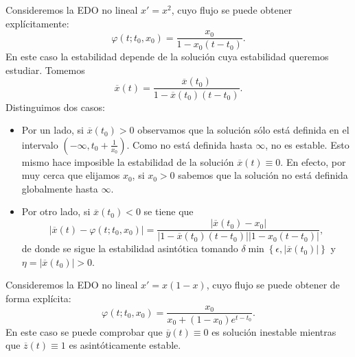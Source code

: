 \begin{eg}
Consideremos la EDO no lineal $\displaystyle x ' = x^{2} $, cuyo flujo se puede obtener explícitamente:
\[\varphi\left(t; t_{0}, x_{0}\right)=\frac{x_{0}}{1-x_{0}\left(t-t_{0}\right)} .\]
En este caso la estabilidad depende de la solución cuya estabilidad queremos estudiar. Tomemos 
\[ \overline{x}\left(t\right)=\frac{\overline{x}\left(t_{0}\right)}{1-\overline{x}\left(t_{0}\right)\left(t-t_{0}\right)} .\]
Distinguimos dos casos:
\begin{itemize}
\item Por un lado, si $\displaystyle \overline{x}\left(t_{0}\right) > 0 $ observamos que la solución sólo está definida en el intervalo $\displaystyle \left(-\infty, t_{0} + \frac{1}{x_{0}}\right) $. Como no está definida hasta $\displaystyle \infty  $, no es estable. Esto mismo hace imposible la estabilidad de la solución $\displaystyle \overline{x}\left(t\right)\equiv 0 $. En efecto, por muy cerca que elijamos $\displaystyle x_{0} $, si $\displaystyle x_{0} > 0 $ sabemos que la solución no está definida globalmente hasta $\displaystyle \infty  $.
\item Por otro lado, si $\displaystyle \overline{x}\left(t_{0}\right) < 0 $ se tiene que 
\[ \left|\overline{x}\left(t\right)-\varphi\left(t; t_{0}, x_{0}\right)\right| = \frac{ \left|\overline{x}\left(t_{0}\right)-x_{0}\right|}{ \left|1-\overline{x}\left(t_{0}\right)\left(t-t_{0}\right)\right| \left|1-x_{0}\left(t-t_{0}\right)\right|} ,\]
de donde se sigue la estabilidad asintótica tomando $\displaystyle \delta \min \left\{ \epsilon , \left|\overline{x}\left(t_{0}\right)\right|\right\}  $ y $\displaystyle \eta = \left|\overline{x}\left(t_{0}\right)\right| > 0 $.
\end{itemize} 
\end{eg}
\begin{eg}
Consideremos la EDO no lineal $\displaystyle x '= x\left(1- x\right) $, cuyo flujo se puede obtener de forma explícita:
\[\varphi\left(t; t_{0}, x_{0}\right)=\frac{x_{0}}{x_{0} + \left(1-x_{0}\right)e^{t-t_{0}}} .\]
En este caso se puede comprobar que $\displaystyle \overline{y}\left(t\right)\equiv 0 $ es solución inestable mientras que $\displaystyle \overline{z}\left(t\right)\equiv 1 $ es asintóticamente estable.
\end{eg}

